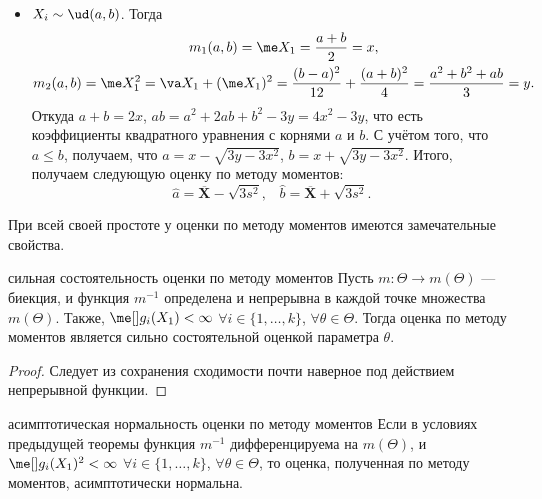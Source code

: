 \begin{example}
\begin{itemize}
        \item $X_i \sim \ud(a, b)$. Тогда 
        \begin{gather*}
            m_1(a, b) = \me X_1 = \frac{a+b}{2}=x,\\
            m_2(a, b) = \me X_1^2 = \va X_1 + (\me X_1)^2 = \frac{(b-a)^2}{12} + \frac{(a+b)^2}{4} = \frac{a^2+b^2+ab}{3} = y.
        \end{gather*}
        Откуда $a+b = 2x$, $ab = a^2 + 2ab + b^2 - 3y = 4x^2 - 3y$, что есть коэффициенты квадратного уравнения с корнями $a$ и $b$. С учётом того, что $a \le b$, получаем, что $a = x - \sqrt{3y - 3x^2}$, $b = x + \sqrt{3y - 3x^2}$. Итого, получаем следующую оценку по методу моментов:
    \[
    \widehat{a} = \overline{\mathbf X} - \sqrt{3s^2},\;\;\;\widehat{b} = \overline{\mathbf X} + \sqrt{3s^2}.
    \]
    \end{itemize}
\end{example}

При всей своей простоте у оценки по методу моментов имеются замечательные свойства.

\begin{theorem}{сильная состоятельность оценки по методу моментов}{}
Пусть $m\colon \Theta \to m(\Theta)$ --- биекция, и функция $m^{-1}$ определена и непрерывна в каждой точке множества $m(\Theta)$. Также, $\me[]g_i(X_1) < \infty$ $\forall{i\in\{1,\ldots, k\}}$, $\forall{\theta \in \Theta}$. Тогда оценка по методу моментов является сильно состоятельной оценкой параметра $\theta$.
\end{theorem}

\begin{proof}
    Следует из сохранения сходимости почти наверное под действием непрерывной функции.
\end{proof}

\begin{theorem}[label=an_for_moment]{асимптотическая нормальность оценки по методу моментов}{}
Если в условиях предыдущей теоремы функция $m^{-1}$ дифференцируема на $m(\Theta)$, и $\me[]g_i(X_1)^2 < \infty$ $\forall{i\in\{1,\ldots, k\}}$, $\forall{\theta \in \Theta}$, то оценка, полученная по методу моментов, асимптотически нормальна.
\end{theorem}

